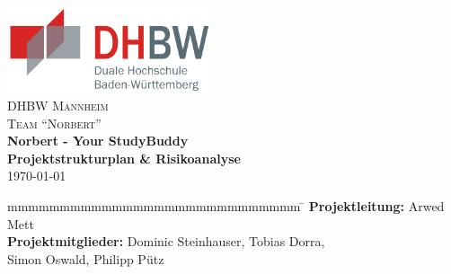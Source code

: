
\begin{titlepage}
	\begin{center}
        \includegraphics[width=0.45\textwidth]{images/dhbw.png}~\\[3cm]
        \textsc{\LARGE DHBW Mannheim}\\[1.5em]
        \textsc{\LARGE Team \enquote{Norbert}}\\[1.5em]
        { \huge \bfseries Norbert - Your StudyBuddy \\[0.5cm] }
        { \LARGE \bfseries Projektstrukturplan \& Risikoanalyse \\[0.4cm] }
        \today
	\end{center}
	\vfill
	\begin{spacing}{1.2}
	\begin{tabbing}
		mmmmmmmmmmmmmmmmmmmmmmmmmmmm \= \kill
        \textbf{Projektleitung:}        \> Arwed Mett\\
        \textbf{Projektmitglieder:}       \> Dominic Steinhauser, Tobias Dorra,\\
     								   \> Simon Oswald, Philipp Pütz\\
	\end{tabbing}
	\end{spacing}
\end{titlepage}
